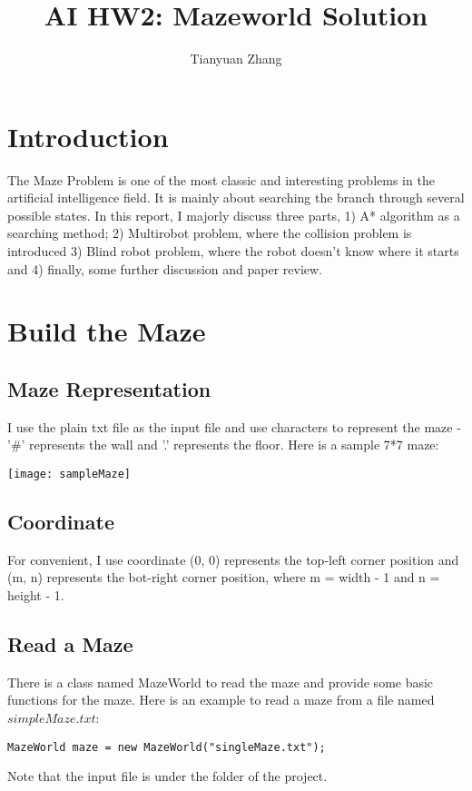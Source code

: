 \documentclass{article}
\title{AI HW2: Mazeworld Solution}
\author{Tianyuan Zhang}
\begin{document}
\maketitle

\section{Introduction}
\begin{flushleft}
The Maze Problem is one of the most classic and interesting problems in the artificial intelligence field. It is mainly about searching the branch through several possible states. In this report, I majorly discuss three parts, 1) A* algorithm as a searching method; 2) Multirobot problem, where the collision problem is introduced 3) Blind robot problem, where the robot doesn't know where it starts and 4) finally, some further discussion and paper review.


\section{Build the Maze}
\subsection{Maze Representation}
I use the plain txt file as the input file and use characters to represent the maze -  '\#' represents the wall and '.' represents the floor. Here is a sample 7*7 maze:

\texttt{[image: sampleMaze]}
\subsection{Coordinate}
For convenient, I use coordinate (0, 0) represents the top-left corner position and (m, n) represents the bot-right corner position, where m = width - 1 and n = height - 1.
\subsection{Read a Maze}
There is a class named MazeWorld to read the maze and provide some basic functions for the maze. Here is an example to read a maze from a file named $simpleMaze.txt$:
\begin{lstlisting}
MazeWorld maze = new MazeWorld("singleMaze.txt");
\end{lstlisting}

\begin{flushleft}
Note that the input file is under the folder of the project.
\end{flushleft}

\end{flushleft}
\end{document}
